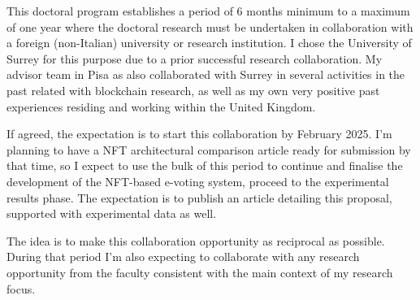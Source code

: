 \documentclass[../main.tex]{subfiles}
\begin{document}
This doctoral program establishes a period of 6 months minimum to a maximum of one year where the doctoral research must be undertaken in collaboration with a foreign (non-Italian) university or research institution. I chose the University of Surrey for this purpose due to a prior successful research collaboration. My advisor team in Pisa as also collaborated with Surrey in several activities in the past related with blockchain research, as well as my own very positive past experiences residing and working within the United Kingdom.
\par
If agreed, the expectation is to start this collaboration by February 2025. I'm planning to have a NFT architectural comparison article ready for submission by that time, so I expect to use the bulk of this period to continue and finalise the development of the NFT-based e-voting system, proceed to the experimental results phase. The expectation is to publish an article detailing this proposal, supported with experimental data as well.
\par
The idea is to make this collaboration opportunity as reciprocal as possible. During that period I'm also expecting to collaborate with any research opportunity from the faculty consistent with the main context of my research focus.
\end{document}
